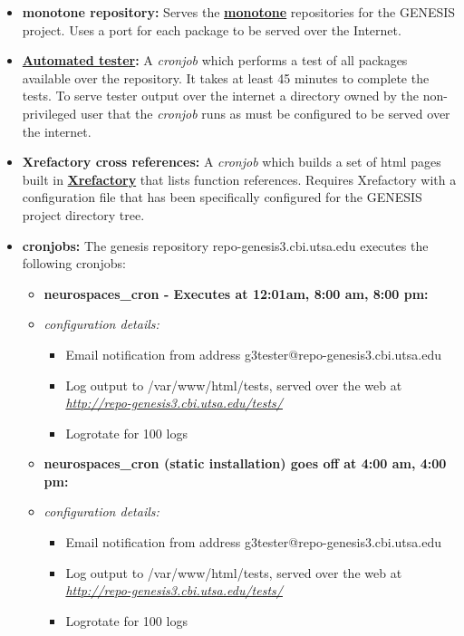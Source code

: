 \documentclass[12pt]{article}
\begin{document}
\begin{itemize}

\item {\bf monotone repository:} Serves the \href{http://www.monotone.ca/}{\bf monotone} repositories for the GENESIS project. Uses a port for each package to be served over the Internet.

\item {\bf \href{../neurospaces-tester/neurospaces-tester.tex}{Automated tester}:} A {\it cronjob} which performs a test of all packages available over the repository.  It takes at least 45 minutes to complete the tests. To serve tester output over the internet a directory owned by the non-privileged user that the {\it cronjob} runs as must be configured to be served over the internet.

\item {\bf Xrefactory cross references:} A {\it cronjob} which builds a set of html pages built in \href{http://www.xref-tech.com/xrefactory/main.html}{\bf Xrefactory} that lists function references.  Requires Xrefactory with a configuration file that has been specifically configured for the GENESIS project directory tree. 

\item {\bf cronjobs:} The genesis repository repo-genesis3.cbi.utsa.edu executes the following cronjobs:

\begin{itemize}
\item[] {\bf neurospaces\_cron - Executes at 12:01am, 8:00 am, 8:00 pm:}
	\item {\it configuration details:} 
\begin{itemize}

	\item Email notification from address g3tester@repo-genesis3.cbi.utsa.edu
	\item Log output to /var/www/html/tests, served over the web at \href{http://repo-genesis3.cbi.utsa.edu/tests/}{\it http://repo-genesis3.cbi.utsa.edu/tests/}
	\item Logrotate for 100 logs
\end{itemize}
		
\item[] {\bf neurospaces\_cron (static installation) \- goes off at 4:00 am, 4:00 pm:}
	\item {\it configuration details:} 
\begin{itemize}

	\item Email notification from address g3tester@repo-genesis3.cbi.utsa.edu
	\item Log output to /var/www/html/tests, served over the web at \href{http://repo-genesis3.cbi.utsa.edu/tests/}{\it http://repo-genesis3.cbi.utsa.edu/tests/}
	\item Logrotate for 100 logs
\end{itemize}


\end{itemize}
\end{itemize}
\end{document}
